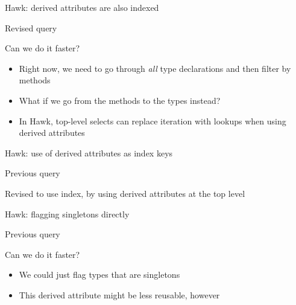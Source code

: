 \begin{frame}{Hawk: derived attributes are also indexed}
  \begin{block}{Revised query}
    
  \end{block}

  \begin{block}{Can we do it faster?}
    \begin{itemize}
    \item Right now, we need to go through \emph{all} type declarations and then
      filter by methods
    \item What if we go from the methods to the types instead?
    \item In Hawk, \alert{top-level selects can replace iteration with lookups
      when using derived attributes}
    \end{itemize}
  \end{block}
\end{frame}

\begin{frame}{Hawk: use of derived attributes as index keys}

  \begin{block}{Previous query}
    
  \end{block}

  \begin{block}{Revised to use index, by using derived attributes at the top level}
    
  \end{block}

\end{frame}

\begin{frame}[fragile]{Hawk: flagging singletons directly}
  \begin{block}{Previous query}
    
  \end{block}

  \begin{block}{Can we do it faster?}
    \begin{itemize}
    \item We could just flag types that are singletons
    \item This derived attribute might be less reusable, however
    \end{itemize}
  \end{block}
\end{frame}

